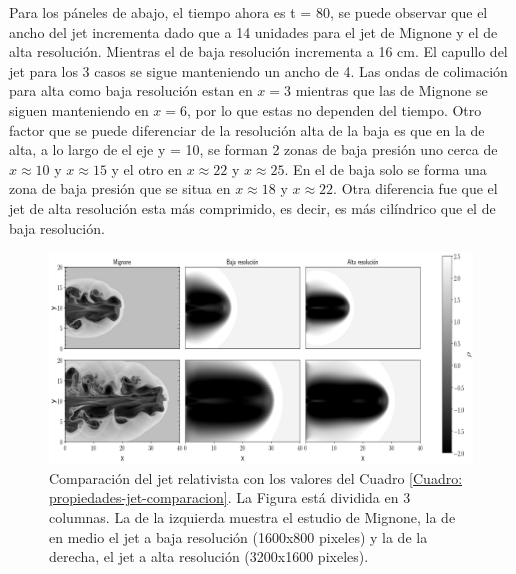 \documentclass[12pt,a4paper]{book}
\begin{document}
{\color{red} Para los páneles de abajo, el tiempo ahora es t = 80, se puede observar que el ancho del jet incrementa
dado que a 14 unidades para el jet de Mignone y el de alta resolución. Mientras el de baja resolución incrementa a 16 cm. 
El capullo del jet para los 3 casos se sigue manteniendo un ancho de 4. Las ondas de colimación para alta como baja resolución
estan en $x = 3$ mientras que las de Mignone se siguen manteniendo en $x = 6$, por lo que estas no dependen del tiempo. 
Otro factor que se puede diferenciar de la resolución alta de la baja es que en la de alta, a lo largo de el eje y = 10, se forman
2 zonas de baja presión uno cerca de $x \approx 10$ y $x \approx 15$ y el otro en $x \approx 22$ y $x \approx 25$. En el de baja
solo se forma una zona de baja presión que se situa en $x \approx 18$ y $x \approx 22$. Otra diferencia fue que el jet de 
alta resolución esta más comprimido, es decir, es más cilíndrico que el de baja resolución.}







 
 




\begin{figure}
  \centering
  \includegraphics[width=1\textwidth]{./Figuras/jet/comparacion/multiple_comparation.png}
    \caption{{\color{red} Comparación del jet relativista con los valores del Cuadro 
    \ref{Cuadro: propiedades-jet-comparacion}. La Figura está dividida en 3 columnas. La de la izquierda muestra
    el estudio de Mignone, la de en medio el jet a baja resolución (1600x800 pixeles) y la de la derecha, el jet a alta 
    resolución (3200x1600 pixeles).}
    }\label{fig:comparacion_temporal_del_jet}
\end{figure}
\end{document}
